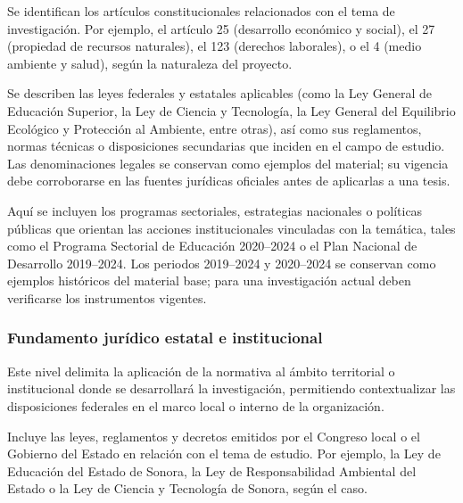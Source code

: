 
Se identifican los artículos constitucionales relacionados con el tema de investigación. Por ejemplo, el artículo 25 (desarrollo económico y social), el 27 (propiedad de recursos naturales), el 123 (derechos laborales), o el 4 (medio ambiente y salud), según la naturaleza del proyecto.


Se describen las leyes federales y estatales aplicables (como la Ley General de Educación Superior, la Ley de Ciencia y Tecnología, la Ley General del Equilibrio Ecológico y Protección al Ambiente, entre otras), así como sus reglamentos, normas técnicas o disposiciones secundarias que inciden en el campo de estudio. Las denominaciones legales se conservan como ejemplos del material; su vigencia debe corroborarse en las fuentes jurídicas oficiales antes de aplicarlas a una tesis.


Aquí se incluyen los programas sectoriales, estrategias nacionales o políticas públicas que orientan las acciones institucionales vinculadas con la temática, tales como el Programa Sectorial de Educación 2020–2024 o el Plan Nacional de Desarrollo 2019–2024. Los periodos 2019–2024 y 2020–2024 se conservan como ejemplos históricos del material base; para una investigación actual deben verificarse los instrumentos vigentes.

\subsubsection{Fundamento jurídico estatal e institucional}

Este nivel delimita la aplicación de la normativa al ámbito territorial o institucional donde se desarrollará la investigación, permitiendo contextualizar las disposiciones federales en el marco local o interno de la organización.


Incluye las leyes, reglamentos y decretos emitidos por el Congreso local o el Gobierno del Estado en relación con el tema de estudio. Por ejemplo, la Ley de Educación del Estado de Sonora, la Ley de Responsabilidad Ambiental del Estado o la Ley de Ciencia y Tecnología de Sonora, según el caso.


